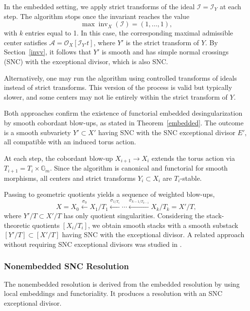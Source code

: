 \documentclass{amsart}
\newcommand{\inv}{{\operatorname{inv}}}
\begin{document}
In the embedded setting, we apply strict transforms of the ideal \( \mathcal{I} = \mathcal{I}_Y \) at each step. The algorithm stops once the invariant reaches the value
\[
\max \inv_X(\mathcal{I}) = (1, \ldots, 1),
\]
with \( k \) entries equal to 1. In this case, the corresponding maximal admissible center satisfies \( \mathcal{A} = \mathcal{O}_X[\mathcal{I}_{Y'} t] \), where \( Y' \) is the strict transform of \( Y \). By Section~\ref{invv}, it follows that \( Y' \) is smooth and has simple normal crossings (SNC) with the exceptional divisor, which is also SNC.

Alternatively, one may run the algorithm using controlled transforms of ideals instead of strict transforms. This version of the process is valid but typically slower, and some centers may not lie entirely within the strict transform of \( Y \).

Both approaches confirm the existence of functorial embedded desingularization by smooth cobordant blow-ups, as stated in Theorem~\ref{embedded}. The outcome is a smooth subvariety \( Y' \subset X' \) having SNC with the SNC exceptional divisor \( E' \), all compatible with an induced torus action.

At each step, the cobordant blow-up \( X_{i+1} \to X_i \) extends the torus action via \( T_{i+1} = T_i \times \mathbb{G}_m \). Since the algorithm is canonical and functorial for smooth morphisms, all centers and strict transforms \( Y_i \subset X_i \) are \( T_i \)-stable.

Passing to geometric quotients yields a sequence of weighted blow-ups,
\[
X = X_0 \xleftarrow{\sigma_0} X_1 / T_1 \xleftarrow{\sigma_{1/T_1}} \cdots \xleftarrow{\sigma_{k-1/T_{k-1}}} X_k / T_k = X' / T,
\]
where \( Y' / T \subset X' / T \) has only quotient singularities. Considering the stack-theoretic quotients \( [X_i / T_i] \), we obtain smooth stacks with a smooth substack \( [Y' / T] \subset [X' / T] \) having SNC with the exceptional divisor. A related approach without requiring SNC exceptional divisors was studied in \cite{ATW-weighted}.

\subsubsection{Nonembedded SNC Resolution}

The nonembedded resolution is derived from the embedded resolution by using local embeddings and functoriality. It produces a resolution with an SNC exceptional divisor.
\end{document}
